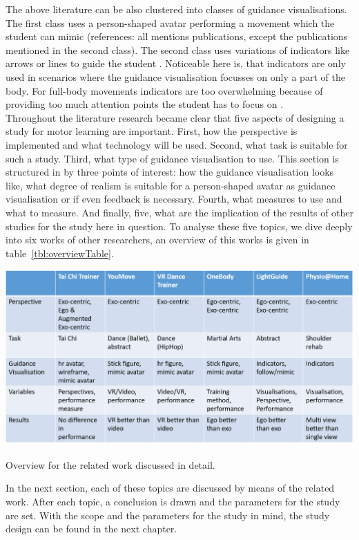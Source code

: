 The above literature can be also clustered into classes of guidance visualisations. The first class uses a person-shaped avatar performing a movement which the student can mimic (references: all mentions publications, except the publications mentioned in the second class). The second class uses variations of indicators like arrows or lines to guide the student \cite{Katzakis2017, Tang2015, Sodhi2012, Covaci2014, Sousa2016}. Noticeable here is, that indicators are only used in scenarios where the guidance visualisation focusses on only a part of the body. For full-body movements indicators are too overwhelming because of providing too much attention points the student has to focus on \cite{Sodhi2012}.\\
Throughout the literature research became clear that five aspects of designing a study for motor learning are important. First, how the perspective is implemented and what technology will be used. Second, what task is suitable for such a study. Third, what type of guidance visualisation to use. This section is structured in by three points of interest: how the guidance visualisation looks like, what degree of realism is suitable for a person-shaped avatar as guidance visualisation or if even feedback is necessary. Fourth, what measures to use and what to measure. And finally, five, what are the implication of the results of other studies for the study here in question. To analyse these five topics, we dive deeply into six works of other researchers, an overview of this works is given in table~\ref{tbl:overviewTable}.
\begin{table}
	\centering
	\includegraphics[width=1.0\textwidth]{img/detail_paper_overview.png}
	\caption{Overview for the related work discussed in detail.}
	\label{tbl:detailOverviewTable}
\end{table}
In the next section, each of these topics are discussed by means of the related work. After each topic, a conclusion is drawn and the parameters for the study are set. With the scope and the parameters for the study in mind, the study design can be found in the next chapter.


